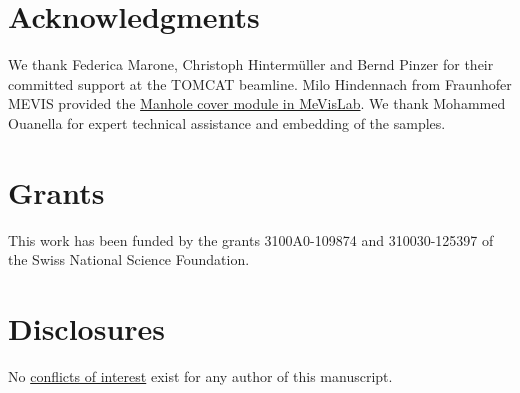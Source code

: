 \documentclass[draft,a4paper,DIVcalc,abstract,english]{scrartcl}
\begin{document}
\clearpage
\section{Acknowledgments}
We thank Federica Marone, Christoph Hintermüller and Bernd Pinzer for their committed support at the TOMCAT beamline.
Milo Hindennach from Fraunhofer MEVIS provided the \href{http://www.mevis-research.de/cgi-bin/discus/board-auth.cgi?lm=1282233250&file=/839/11760.html}{Manhole cover module in MeVisLab}.
We thank Mohammed Ouanella for expert technical assistance and embedding of the samples.

\section{Grants}
This work has been funded by the grants 3100A0-109874 and 310030-125397 of the Swiss National Science Foundation.

\section{Disclosures}
No \href{http://www.the-aps.org/mm/Publications/Preparing-Your-Manuscript#conflicts}{conflicts of interest} exist for any author of this manuscript.

\clearpage
\singlespacing


\end{document}
